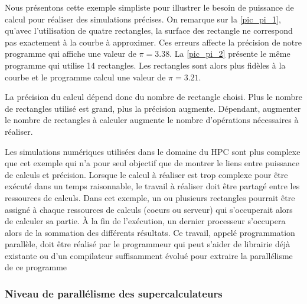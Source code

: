         Nous présentons cette exemple simpliste pour illustrer le besoin de puissance de calcul pour réaliser des simulations précises. On remarque sur la \autoref{pic_pi_1}, qu'avec l'utilisation de quatre rectangles, la surface des rectangle ne correspond pas exactement à la courbe à approximer. Ces erreurs affecte la précision de notre programme qui affiche une valeur de $\pi = 3.38$. La \autoref{pic_pi_2} présente le même programme qui utilise 14 rectangles. Les rectangles sont alors plus fidèles à la courbe et le programme calcul une valeur de $\pi = 3.21$.
        
        La précision du calcul dépend donc du nombre de rectangle choisi. Plus le nombre de rectangles utilisé est grand, plus la précision augmente. Dépendant, augmenter le nombre de rectangles à calculer augmente le nombre d'opérations nécessaires à réaliser.
        
        Les simulations numériques utilisées dans le domaine du HPC sont plus complexe que cet exemple qui n'a pour seul objectif que de montrer le liens entre puissance de calculs et précision. Lorsque le calcul à réaliser est trop complexe pour être exécuté dans un temps raisonnable, le travail à réaliser doit être partagé entre les ressources de calculs. Dans cet exemple, un ou plusieurs rectangles pourrait être assigné à chaque ressources de calculs (coeurs ou serveur) qui s'occuperait alors de calculer sa partie. À la fin de l'exécution, un dernier processeur s'occupera alors de la sommation des différents résultats. Ce travail, appelé programmation parallèle, doit être réalisé par le programmeur qui peut s'aider de librairie déjà existante ou d'un compilateur suffisamment évolué pour extraire la parallélisme de ce programme
        



 
        \subsubsection{Niveau de parallélisme des supercalculateurs}
            
